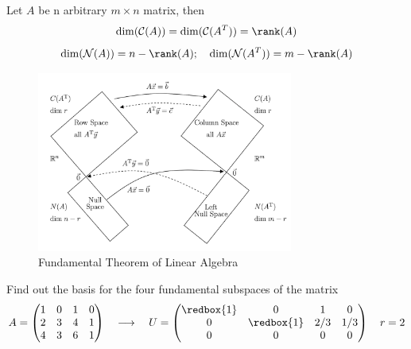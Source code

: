 \begin{theorem}
    Let $A$ be n arbitrary $m \times n$ matrix, then
    \[
        \dim(\mathcal{C}(A)) = \dim(\mathcal{C}(A^T)) = \rank(A)
    \]
    \[
        \dim(\mathcal{N}(A)) = n - \rank(A); \quad \dim(\mathcal{N}(A^T)) = m - \rank(A)
    \]
\end{theorem}

\begin{figure}[H]
    \centering
    \includegraphics[width=0.75\textwidth]{Figures/grah.png}
    \caption{Fundamental Theorem of Linear Algebra}
\end{figure}

\newpage

\begin{eg}
    Find out the basis for the four fundamental subspaces of the matrix
    \[
        A = \begin{pmatrix}
            1 & 0 & 1 & 0 \\
            2 & 3 & 4 & 1 \\
            4 & 3 & 6 & 1
        \end{pmatrix} \quad \longrightarrow \quad U = \begin{pmatrix}
            \redbox{1} & 0 & 1 & 0 \\
            0 & \redbox{1} & 2/3 & 1/3 \\
            0 & 0 & 0 & 0
        \end{pmatrix} \quad r = 2
    \]
\end{eg}


